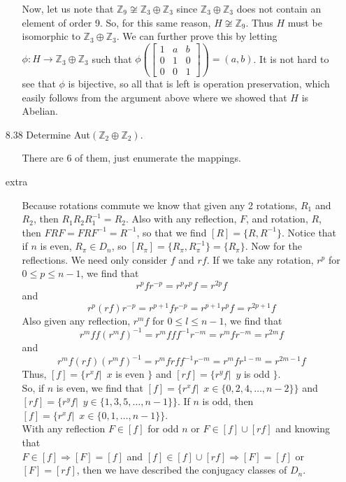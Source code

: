 \documentclass[12pt]{article}
\begin{document}
\begin{enumerate}
\begin{enumerate}
Now, let us note that $\mathbb{Z}_9 \not\cong \mathbb{Z}_3 \oplus \mathbb{Z}_3$ since 
$\mathbb{Z}_3 \oplus \mathbb{Z}_3$ does not contain an element of order 9. So, for this same
reason, $H \not\cong \mathbb{Z}_9$. Thus $H$ must be isomorphic to $\mathbb{Z}_3 \oplus 
\mathbb{Z}_3$. We can further prove this by letting $\phi : H \rightarrow \mathbb{Z}_3 \oplus 
\mathbb{Z}_3$ such that $\phi \left( \left[
\begin{array}{ccc}
1 & a & b \\
0 & 1 & 0 \\
0 & 0 & 1
\end{array}
\right] \right) = (a, b)$. It is not hard to see that $\phi$ is bijective, so all that is left is 
operation preservation, which easily follows from the argument above where we showed that 
$H$ is Abelian.
\end{enumerate}

\item[8.38] Determine Aut$(\mathbb{Z}_2 \oplus \mathbb{Z}_2)$.
\begin{enumerate}
\item[] There are 6 of them, just enumerate the mappings.
\end{enumerate}

\item[extra]
\begin{enumerate}
\item[] Because rotations commute we know that given any 2 rotations, $R_1$ and $R_2$, then
$R_1R_2R_1^{-1} = R_2$. Also with any reflection, $F$, and rotation, $R$, then 
$FRF = FRF^{-1} = R^{-1}$, so that we find $[R] = \{ R, R^{-1} \}$. Notice that if $n$ is even, 
$R_\pi \in D_n$, so $[R_\pi ] = \{ R_\pi , R^{-1}_\pi \} = \{ R_\pi \}$. Now for the reflections. We need 
only consider $f$ and $rf$. If we take any rotation, $r^p$ for $0 \leq p \leq n - 1$, we find 
that 
\[ r^pfr^{-p} = r^pr^pf = r^{2p}f \]
and 
\[
r^p(rf)r^{-p} = r^{p+1}fr^{-p} = r^{p+1}r^pf = r^{2p + 1}f
\]
Also given any reflection, $r^mf$ for $0 \leq l \leq n - 1$, we find that
\[
r^mff(r^mf)^{-1} = r^mfff^{-1}r^{-m} = r^mfr^{-m} = r^{2m}f
\]
and
\[
r^mf(rf)(r^mf)^{-1} = r^mfrff^{-1}r^{-m} = r^mfr^{1 - m} = r^{2m - 1}f
\]
Thus, $[f] = \{ r^xf |\,\,\, x $ is even $\}$ and $[rf] = \{ r^yf |\,\,\, y$ is odd $\}$. \\
So, if $n$ is even, we find that $[f] = \{ r^xf |\,\,\, x \in \{0, 2, 4, \ldots, n-2\}\}$ and
$[rf] = \{ r^yf |\,\,\, y \in \{1, 3, 5, \ldots, n - 1\}\}$. If $n$ is odd, then 
$[f] = \{ r^xf |\,\,\, x \in \{0, 1, \ldots, n - 1\}\}$. \\
With any reflection $F \in [f]$ for odd $n$ or $F \in [f] \cup [rf]$ and knowing that \\
$F \in [f] \Rightarrow [F] = [f]$ and $[f] \in [f] \cup [rf] \Rightarrow [F] = [f]$ or 
$[F] = [rf]$, then we have described the conjugacy classes of $D_n$.
\end{enumerate}



\end{enumerate}
\end{document}

